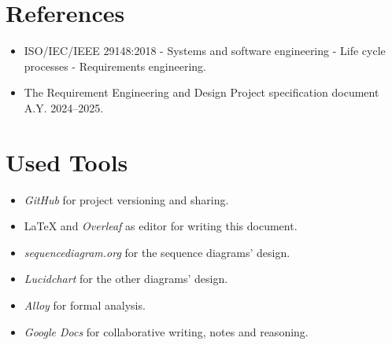 \section{References}
\label{sec:references}%

\begin{itemize}
    \item ISO/IEC/IEEE 29148:2018 - Systems and software engineering - Life cycle processes - Requirements engineering.
    \item The Requirement Engineering and Design Project specification document A.Y. 2024–2025. 
\end{itemize}

\section{Used Tools}
\label{sec:used_tools}%
\begin{itemize}
    \item \textit{GitHub} for project versioning and sharing.
    \item \LaTeX{} and \textit{Overleaf} as editor for writing this document.
    \item \textit{sequencediagram.org} for the sequence diagrams' design.
    \item \textit{Lucidchart} for the other diagrams' design.
    \item \textit{Alloy} for formal analysis.
    \item \textit{Google Docs} for collaborative writing, notes and reasoning.
\end{itemize}
